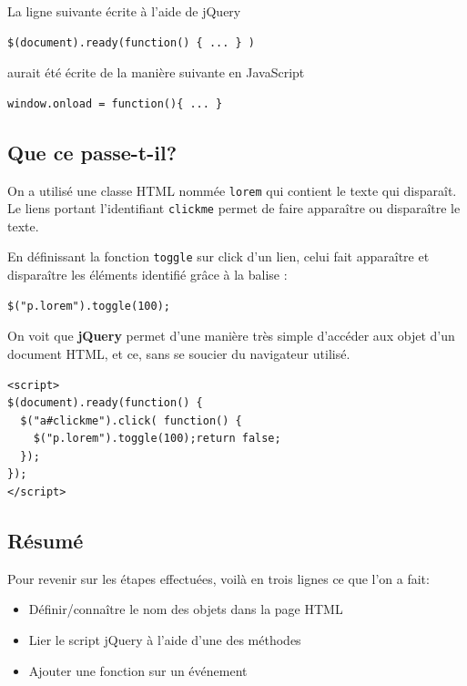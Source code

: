 \documentclass[10pt,a4paper,titlepage]{article}
\begin{document}
La ligne suivante écrite à l'aide de jQuery

\begin{lstlisting}
$(document).ready(function() { ... } )
\end{lstlisting}

aurait été écrite de la manière suivante en JavaScript  

\begin{lstlisting}
window.onload = function(){ ... }
\end{lstlisting}

\subsection{Que ce passe-t-il?}

On a utilisé une classe HTML nommée \texttt{lorem} qui contient le texte qui disparaît. Le liens portant l'identifiant \texttt{clickme} permet de faire apparaître ou disparaître le texte. 

En définissant la fonction \texttt{toggle} sur click d'un lien, celui fait apparaître et  disparaître les éléments identifié grâce à la balise : 

\begin{lstlisting}
$("p.lorem").toggle(100);
\end{lstlisting}

On voit que \textbf{jQuery} permet d'une manière très simple d'accéder aux objet d'un document HTML, et ce, sans se soucier du navigateur utilisé.

\begin{lstlisting}
<script>
$(document).ready(function() {
  $("a#clickme").click( function() {
    $("p.lorem").toggle(100);return false;
  });
});
</script>
\end{lstlisting}

\subsection{Résumé}

Pour revenir sur les étapes effectuées, voilà en trois lignes ce que l'on a fait: \\

\begin{itemize}
	\item Définir/connaître le nom des objets dans la page HTML
	\item Lier le script jQuery à l'aide d'une des méthodes
	\item Ajouter une fonction sur un événement
\end{itemize}
\end{document}
